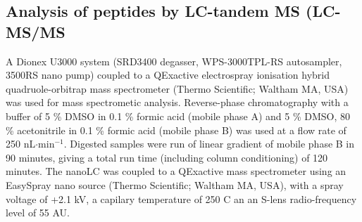 \subsection{Analysis of peptides by LC-tandem MS (LC-MS/MS}
A Dionex U3000 system (SRD3400 degasser, WPS-3000TPL-RS autosampler, 3500RS nano pump) coupled to a QExactive electrospray ionisation hybrid quadruole-orbitrap mass spectrometer (Thermo Scientific; Waltham MA, USA) was used for mass spectrometic analysis. Reverse-phase chromatography with a buffer of 5 \% DMSO in 0.1 \% formic acid (mobile phase A) and 5 \% DMSO, 80 \% acetonitrile in 0.1 \% formic acid (mobile phase B) was used at a flow rate of 250 nL$\cdot$min$^{-1}$. Digested samples were run of linear gradient of mobile phase B in 90 minutes, giving a total run time (including column conditioning) of 120 minutes. The nanoLC was coupled to a QExactive mass spectrometer using an EasySpray nano source (Thermo Scientific; Waltham MA, USA), with a spray voltage of +2.1 kV, a capilary temperature of 250 \textdegree C an an S-lens radio-frequency level of 55 AU. 




































